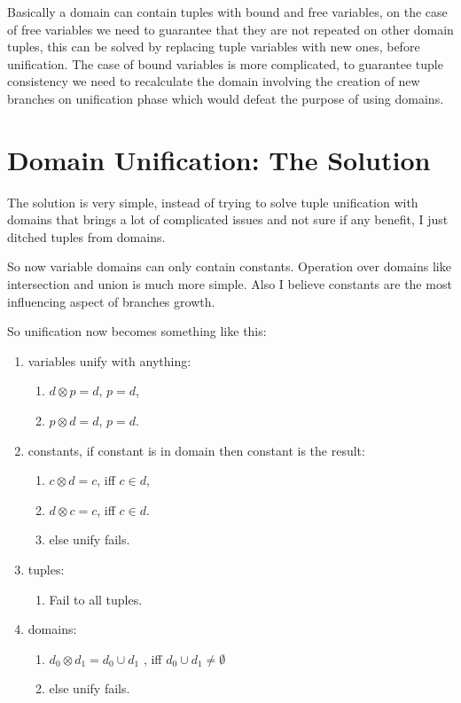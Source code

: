 \documentclass{article}
\begin{document}
Basically a domain can contain tuples with bound and free variables, on the case of free variables we need 
to guarantee that they are not repeated on other domain tuples, this can be solved by replacing tuple 
variables with new ones, before unification. The case of bound variables is more complicated, to guarantee 
tuple consistency we need to recalculate the domain involving the creation of new branches on unification phase
which would defeat the purpose of using domains.

\section{Domain Unification: The Solution}

The solution is very simple, instead of trying to solve tuple unification with domains that brings a lot 
of complicated issues and not sure if any benefit, I just ditched tuples from domains.

So now variable domains can only contain constants. 
Operation over domains like intersection and union is much more simple. 
Also I believe constants are the most influencing aspect of branches growth.

So unification now becomes something like this:

\begin{enumerate}
\item variables unify with anything:
    \begin{enumerate}
        \item $d \otimes p = d$, $p=d$,
        \item $p \otimes d = d$, $p=d$.
    \end{enumerate}

\item constants, if constant is in domain then constant is the result:
    \begin{enumerate}
        \item $c \otimes d = c$, iff $c \in d$,
        \item $d \otimes c = c$, iff $c \in d$.
        \item else unify fails.
    \end{enumerate}

\item tuples: 
    \begin{enumerate}
        \item Fail to all tuples.
    \end{enumerate}

\item domains:
    \begin{enumerate}
        \item $d_{0} \otimes d_{1} = d_{0} \cup d_{1}$ , iff $d_{0} \cup d_{1} \neq \emptyset$
        \item else unify fails.
    \end{enumerate}

\end{enumerate}
\end{document}
